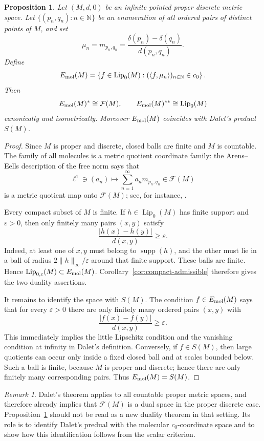 \documentclass[11pt]{amsart}
\theoremstyle{plain}
\newtheorem{proposition}[theorem]{Proposition}
\theoremstyle{definition}
\theoremstyle{remark}
\newtheorem{remark}[theorem]{Remark}
\newcommand{\Lip}{\operatorname{Lip}}
\newcommand{\supp}{\operatorname{supp}}
\newcommand{\F}{\mathcal F}
\newcommand{\N}{\mathbb N}
\begin{document}
\begin{proposition}\label{prop:proper-discrete}
Let $(M,d,0)$ be an infinite pointed proper discrete metric space. Let
$\{(p_n,q_n):n\in\N\}$ be an enumeration of all ordered pairs of distinct
points of $M$, and set
\[
        \mu_n=m_{p_n,q_n}
        =\frac{\delta(p_n)-\delta(q_n)}{d(p_n,q_n)}.
\]
Define
\[
        E_{\rm mol}(M)=\left\{f\in\Lip_0(M):
        (\langle f,
        \mu_n\rangle)_{n\in\N}\in c_0\right\}.
\]
Then
\[
        E_{\rm mol}(M)^*\cong \F(M),
        \qquad
        E_{\rm mol}(M)^{**}\cong \Lip_0(M)
\]
canonically and isometrically. Moreover $E_{\rm mol}(M)$ coincides with
Dalet's predual $S(M)$.
\end{proposition}

\begin{proof}
Since $M$ is proper and discrete, closed balls are finite and $M$ is
countable. The family of all molecules is a metric quotient coordinate
family: the Arens--Eells description of the free norm says that
\[
        \ell^1\ni (a_n)\longmapsto \sum_{n=1}^\infty a_n m_{p_n,q_n}
        \in\F(M)
\]
is a metric quotient map onto $\F(M)$; see, for instance, \cite{GK03,Wea18}.

Every compact subset of $M$ is finite. If $h\in\Lip_0(M)$ has finite
support and $\varepsilon>0$, then only finitely many pairs $(x,y)$ satisfy
\[
        \frac{|h(x)-h(y)|}{d(x,y)}\ge\varepsilon.
\]
Indeed, at least one of $x,y$ must belong to $\supp(h)$, and the other must
lie in a ball of radius $2\|h\|_\infty/\varepsilon$ around that finite
support. These balls are finite. Hence
$\Lip_{0,c}(M)\subset E_{\rm mol}(M)$. Corollary~\ref{cor:compact-admissible}
therefore gives the two duality assertions.

It remains to identify the space with $S(M)$. The condition
$f\in E_{\rm mol}(M)$ says that for every $\varepsilon>0$ there are only
finitely many ordered pairs $(x,y)$ with
\[
        \frac{|f(x)-f(y)|}{d(x,y)}\ge\varepsilon.
\]
This immediately implies the little Lipschitz condition and the vanishing
condition at infinity in Dalet's definition. Conversely, if $f\in S(M)$,
then large quotients can occur only inside a fixed closed ball and at
scales bounded below. Such a ball is finite, because $M$ is proper and
discrete; hence there are only finitely many corresponding pairs. Thus
$E_{\rm mol}(M)=S(M)$.
\end{proof}

\begin{remark}
Dalet's theorem applies to all countable proper metric spaces, and therefore
already implies that $\F(M)$ is a dual space in the proper discrete case.
Proposition~\ref{prop:proper-discrete} should not be read as a new duality
theorem in that setting. Its role is to identify Dalet's predual with the
molecular $c_0$-coordinate space and to show how this identification follows
from the scalar criterion.
\end{remark}
\end{document}
